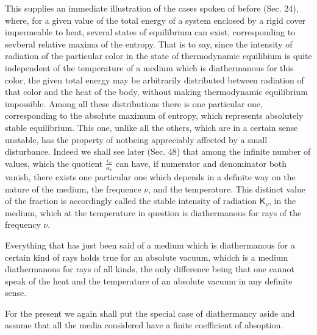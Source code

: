 \documentclass[12pt,oneside]{book}
\begin{document}
This supplies an immediate illustration of the cases spoken of before (Sec. 24), where, for a given value of the total energy of a system enclosed by a rigid cover impermeable to heat, several states of equilibrium can exist, corresponding to sevberal relative maxima of the entropy. That is to say, since the intensity of radiation of the particular color in the state of thermodynamic equilibium is quite independent of the temperature of a medium which is diathermanous for this color, the given total energy may be arbitrarily distributed between radiation of that color and the heat of the body, without making thermodynamic equilibrium impossible. Among all these distributions there is one particular one, corresponding to the absolute maximum of entropy, which represents absolutely stable equilibrium. This one, unlike all the others, which are in a certain sense unstable, has the property of notbeing appreciably affected by a small disturbance. Indeed we shall see later (Sec. 48) that among the infinite number of values, which the quotient $\frac{\epsilon_\nu}{\alpha_\nu}$ can have, if numerator and denominator both vanish, there exists one particular one which depends in a definite way on the nature of the medium, the frequence $\nu$, and the temperature. This distinct value of the fraction is accordingly called the stable intensity of radiation $\mathsf{K}_\nu$, in the medium, which at the temperature in question is diathermanous for rays of the frequency $\nu$. \par 

Everything that has just been said of a medium which is diathermanous for a certain kind of rays holds true for an absolute vacuum, whidch is a medium diathermanous for rays of all kinds, the only difference being that one cannot speak of the heat and the temperature of an absolute vacuum in any definite sense. \par 

For the present we again shall put the special case of diathermancy aside and assume that all the media considered have a finite coefficient of absoption. \par 
\end{document}
